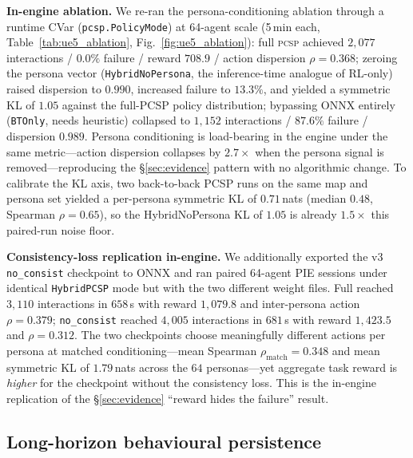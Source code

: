 \documentclass[conference]{IEEEtran}
\newcommand{\PCSP}{\textsc{pcsp}\xspace}
\begin{document}
\textbf{In-engine ablation.}
We re-ran the persona-conditioning ablation through a runtime CVar
(\texttt{pcsp.PolicyMode}) at 64-agent scale (5\,min each,
Table~\ref{tab:ue5_ablation}, Fig.~\ref{fig:ue5_ablation}):
full \PCSP achieved $2{,}077$ interactions / $0.0\%$ failure / reward $708.9$ /
action dispersion $\rho = 0.368$; zeroing the persona vector
(\texttt{HybridNoPersona}, the inference-time analogue of RL-only) raised
dispersion to $0.990$, increased failure to $13.3\%$, and yielded a symmetric KL
of $1.05$ against the full-PCSP policy distribution; bypassing ONNX entirely
(\texttt{BTOnly}, needs heuristic) collapsed to $1{,}152$ interactions / $87.6\%$
failure / dispersion $0.989$. Persona conditioning is load-bearing in the engine
under the same metric---action dispersion collapses by $2.7\times$ when the
persona signal is removed---reproducing the \S\ref{sec:evidence} pattern with no
algorithmic change. To calibrate the KL axis, two back-to-back PCSP runs on the
same map and persona set yielded a per-persona symmetric KL of $0.71$\,nats
(median $0.48$, Spearman $\rho = 0.65$), so the HybridNoPersona KL of $1.05$ is
already $1.5\times$ this paired-run noise floor.

\textbf{Consistency-loss replication in-engine.}
We additionally exported the v3 \texttt{no\_consist} checkpoint to ONNX and ran
paired 64-agent PIE sessions under identical \texttt{HybridPCSP} mode but with
the two different weight files. Full reached $3{,}110$ interactions in
$658$\,s with reward $1{,}079.8$ and inter-persona action $\rho = 0.379$;
\texttt{no\_consist} reached $4{,}005$ interactions in $681$\,s with reward
$1{,}423.5$ and $\rho = 0.312$. The two checkpoints choose meaningfully
different actions per persona at matched conditioning---mean Spearman
$\rho_{\text{match}} = 0.348$ and mean symmetric KL of $1.79$\,nats across the
$64$ personas---yet aggregate task reward is \emph{higher} for the checkpoint
without the consistency loss. This is the in-engine replication of the
\S\ref{sec:evidence} ``reward hides the failure'' result.

\subsection{Long-horizon behavioural persistence}
\label{sec:ue5_persistence}
\end{document}
